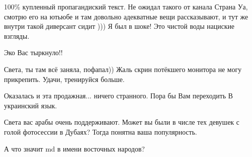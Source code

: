 \begin{itemize}
\begin{itemize}
100\% купленный пропагандиский текст. Не ожидал такого от канала Страна Уа,
смотрю его на ютьюбе и там довольно адекватные вещи рассказывают, и тут же
внутри такой диверсант сидит ))) Я был в шоке! Это чистой воды нациские
взгляды.

\end{itemize}

 
Эко Вас тыркнуло!!

 
Света, ты там всё заняла, пофапал)) Жаль скрин потёкшего монитора не могу прикрепить. Удачи, тренируйся больше.

 
Оказалась и эта продажная... ничего странного. Пора бы Вам переходить В украинский язык.

 
Света вас арабы очень поддерживают. Может вы были в числе тех девушек с голой фотосессии в Дубаях? Тогда понятна ваша популярность.

 
А что значит md в имени восточных народов?

 


\end{itemize}
